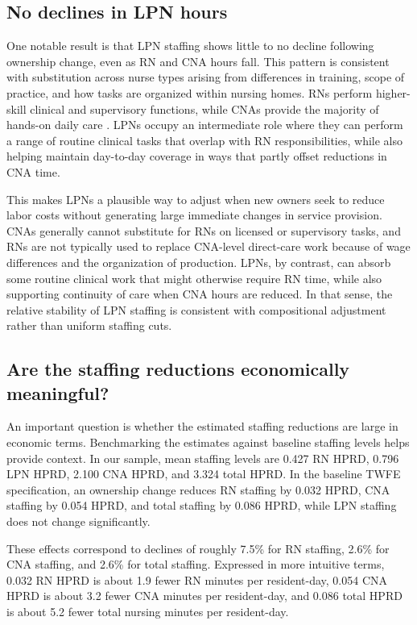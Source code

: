 \documentclass[12pt]{article}
\begin{document}
\subsection{No declines in LPN hours}

One notable result is that LPN staffing shows little to no decline following ownership change, even as RN and CNA hours fall. This pattern is consistent with substitution across nurse types arising from differences in training, scope of practice, and how tasks are organized within nursing homes. RNs perform higher-skill clinical and supervisory functions, while CNAs provide the majority of hands-on daily care \citep{lin_2014}. LPNs occupy an intermediate role where they can perform a range of routine clinical tasks that overlap with RN responsibilities, while also helping maintain day-to-day coverage in ways that partly offset reductions in CNA time.

This makes LPNs a plausible way to adjust when new owners seek to reduce labor costs without generating large immediate changes in service provision. CNAs generally cannot substitute for RNs on licensed or supervisory tasks, and RNs are not typically used to replace CNA-level direct-care work because of wage differences and the organization of production. LPNs, by contrast, can absorb some routine clinical work that might otherwise require RN time, while also supporting continuity of care when CNA hours are reduced. In that sense, the relative stability of LPN staffing is consistent with compositional adjustment rather than uniform staffing cuts.

\subsection{Are the staffing reductions economically meaningful?}

An important question is whether the estimated staffing reductions are large in economic terms. Benchmarking the estimates against baseline staffing levels helps provide context. In our sample, mean staffing levels are 0.427 RN HPRD, 0.796 LPN HPRD, 2.100 CNA HPRD, and 3.324 total HPRD. In the baseline TWFE specification, an ownership change reduces RN staffing by 0.032 HPRD, CNA staffing by 0.054 HPRD, and total staffing by 0.086 HPRD, while LPN staffing does not change significantly.

These effects correspond to declines of roughly 7.5\% for RN staffing, 2.6\% for CNA staffing, and 2.6\% for total staffing. Expressed in more intuitive terms, 0.032 RN HPRD is about 1.9 fewer RN minutes per resident-day, 0.054 CNA HPRD is about 3.2 fewer CNA minutes per resident-day, and 0.086 total HPRD is about 5.2 fewer total nursing minutes per resident-day.
\end{document}
